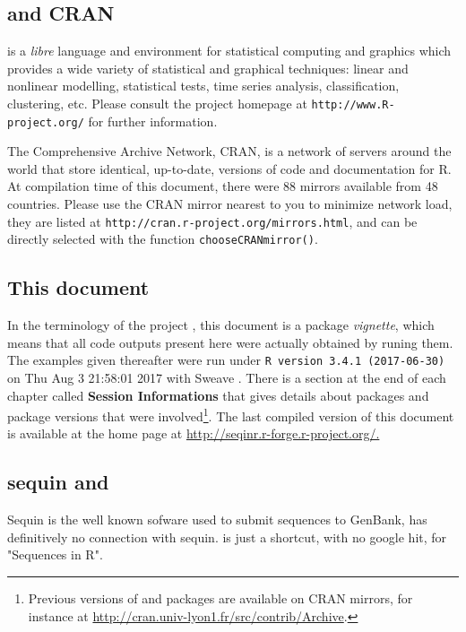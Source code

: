 \documentclass{article}
\begin{document}
\subsection{\Rlogo{} and CRAN}

\Rlogo{} \cite{R, RfromR} is a \emph{libre} language and environment for statistical computing and graphics 
which provides a wide variety of statistical and graphical techniques: linear and 
nonlinear modelling, statistical tests, time series analysis, classification, clustering, etc. 
Please consult the \Rlogo{} project homepage at \texttt{http://www.R-project.org/} for 
further information. 


The Comprehensive \Rlogo{} Archive Network, CRAN, is a network of servers 
around the world that store identical, up-to-date, versions of code and documentation 
for R. At compilation time of this document, there were
88 
mirrors available 
from 48 countries.
Please use the CRAN mirror nearest to you to minimize network load, they are
listed at \texttt{http://cran.r-project.org/mirrors.html}, and can be directly
selected with the function \texttt{chooseCRANmirror()}.

\subsection{This document}

In the terminology of the \Rlogo{} project \cite{R, RfromR}, this document 
is a package \emph{vignette}, which means that all code outputs present 
here were actually obtained by runing them.
The examples given thereafter were run under \texttt{R version 3.4.1 (2017-06-30)}
on Thu Aug  3 21:58:01 2017 with Sweave \cite{Sweave}. There is a section at the end of
each chapter called \textbf{Session Informations} that gives details about
packages and package versions that were involved\footnote{
Previous versions of \Rlogo{} and packages are available on CRAN mirrors,
for instance at \url{http://cran.univ-lyon1.fr/src/contrib/Archive}.
}.
The last compiled version of this document is available at the \seqinr{}
home page at \url{http://seqinr.r-forge.r-project.org/.}


\subsection{sequin and \seqinr{}}

Sequin is the well known sofware used to submit sequences to GenBank, \seqinr{}
\cite{seqinr} has definitively no connection with sequin. \seqinr{} is just a shortcut, with
no google hit, for "Sequences in R".
\end{document}
